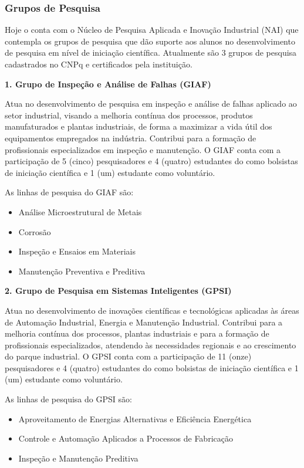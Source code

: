 \subsubsection{Grupos de Pesquisa}

Hoje o \NOMECURSO conta com o Núcleo de Pesquisa Aplicada e Inovação Industrial (NAI)
que contempla os grupos de pesquisa que dão suporte aos alunos no desenvolvimento de pesquisa em nível de iniciação científica. Atualmente são 3 grupos de pesquisa cadastrados no CNPq e certificados pela instituição.

\vspace{0.5cm}

\noindent \textbf{1. Grupo de Inspeção e Análise de Falhas (GIAF)}

Atua no desenvolvimento de pesquisa em inspeção e análise de falhas aplicado ao setor industrial, visando a melhoria contínua dos processos, produtos manufaturados e plantas industriais, de forma a maximizar a vida útil dos equipamentos empregados na indústria. Contribui para a formação de profissionais especializados em inspeção e manutenção. O GIAF conta com a participação de 5 (cinco) pesquisadores e 4 (quatro) estudantes do \NOMECURSO como bolsistas de iniciação científica e 1 (um) estudante como voluntário.

As linhas de pesquisa do GIAF são:
\begin{itemize}
	\item Análise Microestrutural de Metais
	\item Corrosão
	\item Inspeção e Ensaios em Materiais
	\item Manutenção Preventiva e Preditiva
\end{itemize}

\noindent \textbf{2. Grupo de Pesquisa em Sistemas Inteligentes (GPSI)}

Atua no desenvolvimento de inovações científicas e tecnológicas aplicadas às áreas de Automação Industrial, Energia e Manutenção Industrial. Contribui para a melhoria contínua dos processos, plantas industriais e para a formação de profissionais especializados, atendendo às necessidades regionais e ao crescimento do parque industrial. O GPSI conta com a participação de 11 (onze) pesquisadores e 4 (quatro) estudantes do \NOMECURSO como bolsistas de iniciação científica e 1 (um) estudante como voluntário.

As linhas de pesquisa do GPSI são:
\begin{itemize}
	\item Aproveitamento de Energias Alternativas e Eficiência Energética
	\item Controle e Automação Aplicados a Processos de Fabricação
	\item Inspeção e Manutenção Preditiva
\end{itemize}


